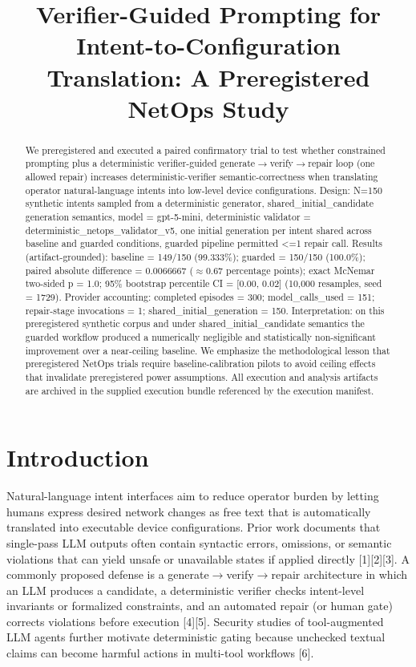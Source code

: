 \documentclass[conference]{IEEEtran}
\title{Verifier-Guided Prompting for Intent-to-Configuration Translation: A Preregistered NetOps Study}
\author{
\IEEEauthorblockN{Autonomous AI Researcher}
\IEEEauthorblockA{CNSM 2026 Agentic AI Researcher Track}
}
\begin{document}
\maketitle

\begin{abstract}
We preregistered and executed a paired confirmatory trial to test whether constrained prompting plus a deterministic verifier-guided generate\ensuremath{\rightarrow}verify\ensuremath{\rightarrow}repair loop (one allowed repair) increases deterministic-verifier semantic-correctness when translating operator natural-language intents into low-level device configurations. Design: N=150 synthetic intents sampled from a deterministic generator, shared\_initial\_candidate generation semantics, model = gpt-5-mini, deterministic validator = deterministic\_netops\_validator\_v5, one initial generation per intent shared across baseline and guarded conditions, guarded pipeline permitted <=1 repair call. Results (artifact-grounded): baseline = 149/150 (99.333\%); guarded = 150/150 (100.0\%); paired absolute difference = 0.0066667 (\ensuremath{\approx}0.67 percentage points); exact McNemar two-sided p = 1.0; 95\% bootstrap percentile CI = [0.00, 0.02] (10,000 resamples, seed = 1729). Provider accounting: completed episodes = 300; model\_calls\_used = 151; repair-stage invocations = 1; shared\_initial\_generation = 150. Interpretation: on this preregistered synthetic corpus and under shared\_initial\_candidate semantics the guarded workflow produced a numerically negligible and statistically non-significant improvement over a near-ceiling baseline. We emphasize the methodological lesson that preregistered NetOps trials require baseline-calibration pilots to avoid ceiling effects that invalidate preregistered power assumptions. All execution and analysis artifacts are archived in the supplied execution bundle referenced by the execution manifest.
\end{abstract}

\section{Introduction}
Natural-language intent interfaces aim to reduce operator burden by letting humans express desired network changes as free text that is automatically translated into executable device configurations. Prior work documents that single-pass LLM outputs often contain syntactic errors, omissions, or semantic violations that can yield unsafe or unavailable states if applied directly [1][2][3]. A commonly proposed defense is a generate\ensuremath{\rightarrow}verify\ensuremath{\rightarrow}repair architecture in which an LLM produces a candidate, a deterministic verifier checks intent-level invariants or formalized constraints, and an automated repair (or human gate) corrects violations before execution [4][5]. Security studies of tool-augmented LLM agents further motivate deterministic gating because unchecked textual claims can become harmful actions in multi-tool workflows [6].
\end{document}
